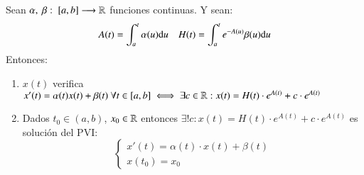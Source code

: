 \begin{pro}
    Sean $\alpha,\ \beta:\ [a,b] \longrightarrow \mathbb{R}$ funciones continuas. Y sean:
    \begin{gather*}
        A(t) = \int_a^t \alpha(u) \mathrm{d} u \ \ \ \ H(t) = \int_a^t e^{-A(u)} \beta(u) \mathrm{d} u
    \end{gather*}
    Entonces:
    \begin{enumerate}
        \item $x(t)$ verifica $x'(t) = \alpha(t)x(t)+\beta(t)\ \forall t \in [a,b] \iff \exists c \in \R : x(t) = H(t) \cdot e^{A(t)} + c \cdot e^{A(t)}$
        \item Dados $t_0 \in (a,b)$, $x_0 \in \mathbb{R}$ entonces $\exists ! c : x(t) = H(t) \cdot e^{A(t)} + c \cdot e^{A(t)}$ es solución del PVI:
        $$
            \begin{cases}
                x'(t) = \alpha(t)\cdot x(t) + \beta(t)\\
                x(t_0) = x_0
            \end{cases}
        $$
    \end{enumerate}
\end{pro}

